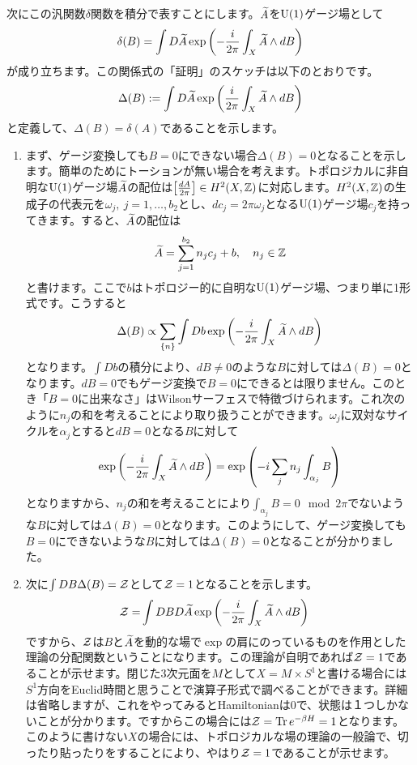 \documentclass[generalized_symmetry.tex]{subfiles}
\begin{document}
次にこの汎関数$\delta$関数を積分で表すことにします。$\widetilde{A}$を$\mbox{U}(1)$ゲージ場として
\begin{align}
  \delta(B) = \int D\widetilde{A} \exp\left(-\frac{i}{2\pi}\int_{X} \widetilde{A} \wedge dB\right)
  \label{integralBdelta}
\end{align}
が成り立ちます。この関係式の「証明」のスケッチは以下のとおりです。
\begin{align}
\Delta(B):=\int D\widetilde{A} \exp\left(\frac{i}{2\pi}\int_{X} \widetilde{A} \wedge dB\right)  
\end{align}
と定義して、$\Delta(B)=\delta(A)$であることを示します。
\begin{enumerate}
  \item まず、ゲージ変換しても$B=0$にできない場合$\Delta(B)=0$となることを示します。簡単のためにトーションが無い場合を考えます。トポロジカルに非自明な$\mbox{U}(1)$ゲージ場$\widetilde{A}$の配位は$\left[\frac{dA}{2\pi}\right] \in H^2(X,\mathbb{Z})$に対応します。$H^2(X,\mathbb{Z})$の生成子の代表元を$\omega_j,\ j=1,\dots,b_2$とし、$dc_j=2\pi \omega_j$となる$\mbox{U}(1)$ゲージ場$c_j$を持ってきます。すると、$\widetilde{A}$の配位は
  \begin{align}
    \widetilde{A} = \sum_{j=1}^{b_2} n_j c_j + b,\quad n_j \in \mathbb{Z}
  \end{align}
  と書けます。ここで$b$はトポロジー的に自明な$\mbox{U}(1)$ゲージ場、つまり単に1形式です。こうすると
  \begin{align}
    \Delta(B) \propto \sum_{\{n\} } \int Db \exp\left(-\frac{i}{2\pi}\int_{X} \widetilde{A} \wedge dB\right)
  \end{align}
  となります。$\int Db$の積分により、$dB\ne 0$のような$B$に対しては$\Delta(B)=0$となります。$dB=0$でもゲージ変換で$B=0$にできるとは限りません。このとき「$B=0$に出来なさ」はWilsonサーフェスで特徴づけられます。これ次のように$n_j$の和を考えることにより取り扱うことができます。$\omega_j$に双対なサイクルを$\alpha_j$とすると$dB=0$となる$B$に対して
  \begin{align}
    \exp\left(-\frac{i}{2\pi}\int_{X} \widetilde{A} \wedge dB\right) = \exp\left(-i\sum_j n_j \int_{\alpha_j} B\right)
  \end{align}
  となりますから、$n_j$の和を考えることにより$\int_{\alpha_j} B =0 \mod 2\pi$でないような$B$に対しては$\Delta(B)=0$となります。このようにして、ゲージ変換しても$B=0$にできないような$B$に対しては$\Delta(B)=0$となることが分かりました。
  \item 次に$\int DB \Delta(B)=\mathcal{Z}$として$\mathcal{Z}=1$となることを示します。
  \begin{align}
    \mathcal{Z}=&\int DB D\widetilde{A} \exp\left(-\frac{i}{2\pi}\int_{X} \widetilde{A} \wedge dB\right)
    \label{trivialtheory}
  \end{align}
  ですから、$\mathcal{Z}$は$B$と$\widetilde{A}$を動的な場で$\exp$の肩にのっているものを作用とした理論の分配関数ということになります。この理論が自明であれば$\mathcal{Z}=1$であることが示せます。閉じた3次元面を$M$として$X=M \times S^1$と書ける場合には$S^1$方向をEuclid時間と思うことで演算子形式で調べることができます。詳細は省略しますが、これをやってみるとHamiltonianは$0$で、状態は１つしかないことが分かります。ですからこの場合には$\mathcal{Z}=\Tr e^{-\beta H}=1$となります。このように書けない$X$の場合には、トポロジカルな場の理論の一般論で、切ったり貼ったりをすることにより、やはり$\mathcal{Z}=1$であることが示せます。
\end{enumerate}
\end{document}
